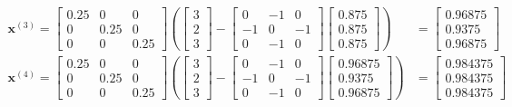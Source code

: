 \documentclass[]{article}
\begin{document}
\begin{align*}
    \mathbf{x}^{(3)} = \begin{bmatrix}
        0.25 & 0 & 0\\
        0 & 0.25 & 0\\
        0 & 0 & 0.25
    \end{bmatrix} \left(\begin{bmatrix}
        3\\
        2\\
        3
    \end{bmatrix} - \begin{bmatrix}
        0 & -1 & 0\\
        -1 & 0 & -1\\
        0 & -1 & 0
    \end{bmatrix}\begin{bmatrix}
        0.875\\
        0.875\\
        0.875
    \end{bmatrix}\right)
    &=
    \begin{bmatrix}
        0.96875\\
        0.9375\\
        0.96875
    \end{bmatrix}\\
    \mathbf{x}^{(4)} = \begin{bmatrix}
        0.25 & 0 & 0\\
        0 & 0.25 & 0\\
        0 & 0 & 0.25
    \end{bmatrix} \left(\begin{bmatrix}
        3\\
        2\\
        3
    \end{bmatrix} - \begin{bmatrix}
        0 & -1 & 0\\
        -1 & 0 & -1\\
        0 & -1 & 0
    \end{bmatrix}\begin{bmatrix}
        0.96875\\
        0.9375\\
        0.96875
    \end{bmatrix}\right)
    &=
    \begin{bmatrix}
        0.984375\\
        0.984375\\
        0.984375
    \end{bmatrix}\\

\end{align*}
\end{document}
